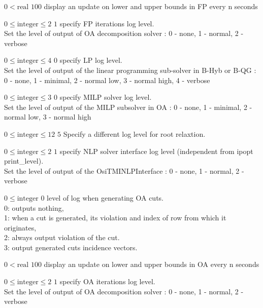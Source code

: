%
{$0<\textrm{real}$}%
{$100$}%
{display an update on lower and upper bounds in FP every n seconds}%
{}

%
{$0\leq\textrm{integer}\leq2$}%
{$1$}%
{specify FP iterations log level.\\
Set the level of output of OA decomposition solver : 0 - none, 1 - normal, 2 - verbose}%
{}

%
{$0\leq\textrm{integer}\leq4$}%
{$0$}%
{specify LP log level.\\
Set the level of output of the linear programming sub-solver in B-Hyb or B-QG : 0 - none, 1 - minimal, 2 - normal low, 3 - normal high, 4 - verbose}%
{}

%
{$0\leq\textrm{integer}\leq3$}%
{$0$}%
{specify MILP solver log level.\\
Set the level of output of the MILP subsolver in OA : 0 - none, 1 - minimal, 2 - normal low, 3 - normal high}%
{}

%
{$0\leq\textrm{integer}\leq12$}%
{$5$}%
{ Specify a different log level for root relaxtion.}%
{}

%
{$0\leq\textrm{integer}\leq2$}%
{$1$}%
{specify NLP solver interface log level (independent from ipopt print\_level).\\
Set the level of output of the OsiTMINLPInterface : 0 - none, 1 - normal, 2 - verbose}%
{}

%
{$0\leq\textrm{integer}$}%
{$0$}%
{level of log when generating OA cuts.\\
0: outputs nothing,\\1: when a cut is generated, its violation and index of row from which it originates,\\2: always output violation of the cut.\\3: output generated cuts incidence vectors.}%
{}

%
{$0<\textrm{real}$}%
{$100$}%
{display an update on lower and upper bounds in OA every n seconds}%
{}

%
{$0\leq\textrm{integer}\leq2$}%
{$1$}%
{specify OA iterations log level.\\
Set the level of output of OA decomposition solver : 0 - none, 1 - normal, 2 - verbose}%
{}

